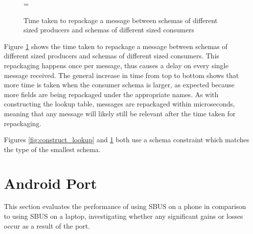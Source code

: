\documentclass[12pt,twoside,notitlepage]{report}
\begin{document}
\begin{figure}[tbh]
\epsfxsize=\hsize
\centerline{}
\caption[Repackage Message]{Time taken to repackage a message between schemas of different sized producers and schemas of different sized consumers}
\label{fig:repack_message}
\end{figure}

Figure \ref{fig:repack_message} shows the time taken to repackage a message between schemas of different sized producers and schemas of different sized consumers. 
This repackaging happens once per message, thus causes a delay on every single message received. 
The general increase in time from top to bottom shows that more time is taken when the consumer schema is larger, as expected because more fields are being repackaged under the appropriate names. 
As with constructing the lookup table, messages are repackaged within microseconds, meaning that any message will likely still be relevant after the time taken for repackaging.

Figures \ref{fig:construct_lookup} and \ref{fig:repack_message} both use a schema constraint which matches the type of the smallest schema.

\section{Android Port}

This section evaluates the performance of using SBUS on a phone in comparison to using SBUS on a laptop, investigating whether any significant gains or losses occur as a result of the port.
\end{document}

